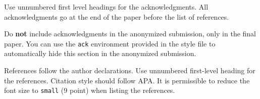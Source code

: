 \documentclass{aimc2026}
\begin{document}
Use unnumbered first level headings for the acknowledgments.
All acknowledgments go at the end of the paper before the list of references.

Do {\bf not} include acknowledgments in the anonymized submission, only in the final paper. You can use the \texttt{ack} environment provided in the style file to automatically hide this section in the anonymized submission.





References follow the author declarations. Use unnumbered first-level heading for the references. Citation style should follow APA. It is permissible to reduce the font size to \texttt{small} (9 point) when listing the references.
\end{document}

